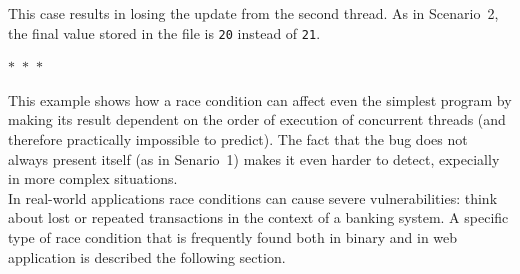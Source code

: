 This case results in losing the update from the second thread. As in Scenario~2, the final value stored in the file is \texttt{20} instead of \texttt{21}.

\begin{center}
  $\ast$~$\ast$~$\ast$
\end{center}

This example shows how a race condition can affect even the simplest program by making its result dependent on the order of execution of concurrent threads (and therefore practically impossible to predict). The fact that the bug does not always present itself (as in Senario~1) makes it even harder to detect, expecially in more complex situations. \\

In real-world applications race conditions can cause severe vulnerabilities: think about lost or repeated transactions in the context of a banking system. A specific type of race condition that is frequently found both in binary and in web application is described the following section.

